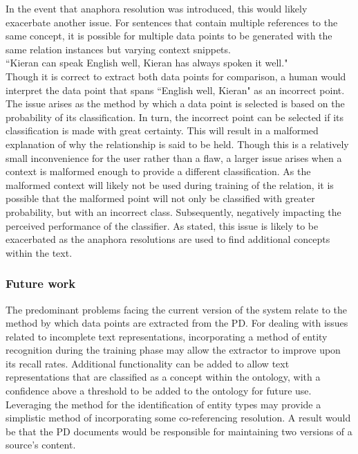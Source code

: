 \documentclass[12pt]{article} %
\begin{document}
In the event that anaphora resolution was introduced, this would likely exacerbate another issue. For sentences that contain multiple references to the same concept, it is possible for multiple data points to be generated with the same relation instances but varying context snippets.\\

\noindent``Kieran can speak English well, Kieran has always spoken it well."\\

Though it is correct to extract both data points for comparison, a human would interpret the data point that spans ``English well, Kieran" as an incorrect point. The issue arises as the method by which a data point is selected is based on the probability of its classification. In turn, the incorrect point can be selected if its classification is made with great certainty. This will result in a malformed explanation of why the relationship is said to be held. Though this is a relatively small inconvenience for the user rather than a flaw, a larger issue arises when a context is malformed enough to provide a different classification. As the malformed context will likely not be used during training of the relation, it is possible that the malformed point will not only be classified with greater probability, but with an incorrect class. Subsequently, negatively impacting the perceived performance of the classifier. As stated, this issue is likely to be exacerbated as the anaphora resolutions are used to find additional concepts within the text.\\


\subsubsection{Future work}

The predominant problems facing the current version of the system relate to the method by which data points are extracted from the PD. For dealing with issues related to incomplete text representations, incorporating a method of entity recognition during the training phase may allow the extractor to improve upon its recall rates. Additional functionality can be added to allow text representations that are classified as a concept within the ontology, with a confidence above a threshold to be added to the ontology for future use.\\

Leveraging the \cite{exploringVarious} method for the identification of entity types may provide a simplistic method of incorporating some co-referencing resolution. A result would be that the PD documents would be responsible for maintaining two versions of a source's content.\\
\end{document}
